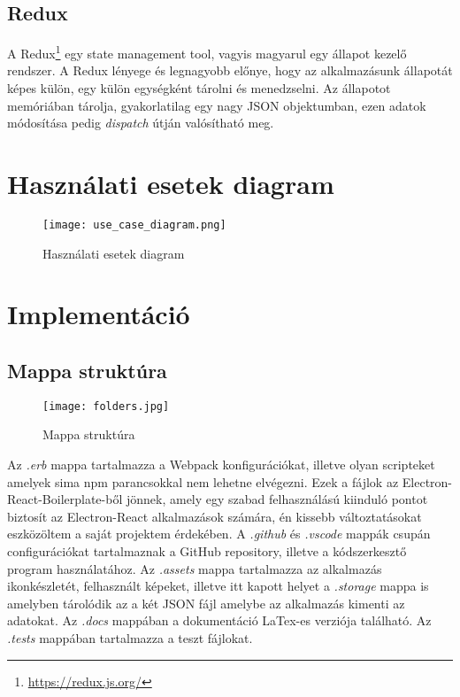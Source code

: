 \subsection{Redux}
A Redux\footnote{\url{https://redux.js.org/}} egy state management tool, vagyis magyarul egy állapot kezelő rendszer. A Redux lényege és legnagyobb előnye, hogy az alkalmazásunk állapotát képes külön, egy külön egységként tárolni és menedzselni. Az állapotot memóriában tárolja, gyakorlatilag egy nagy JSON objektumban, ezen adatok módosítása pedig {\it dispatch} útján valósítható meg.

\cleardoublepage
\section{Használati esetek diagram}
\begin{figure}[H]
	\centering
	\texttt{[image: use\_case\_diagram.png]}
	\caption{Használati esetek diagram}
	\label{fig:use_case_diagram}
\end{figure}

\section{Implementáció}

\subsection{Mappa struktúra}
\begin{figure}[H]
	\centering
	\texttt{[image: folders.jpg]}
	\caption{Mappa struktúra}
	\label{fig:folders}
\end{figure}
Az {\it .erb} mappa tartalmazza a Webpack konfigurációkat, illetve olyan scripteket amelyek sima npm parancsokkal nem lehetne elvégezni. Ezek a fájlok az Electron-React-Boilerplate-ből jönnek, amely egy szabad felhasználású kiinduló pontot biztosít az Electron-React alkalmazások számára, én kissebb változtatásokat eszközöltem a saját projektem érdekében.
A {\it .github} és {\it .vscode} mappák csupán configurációkat tartalmaznak a GitHub repository, illetve a kódszerkesztő program használatához.
Az {\it .assets} mappa tartalmazza az alkalmazás ikonkészletét, felhasznált képeket, illetve itt kapott helyet a {\it .storage} mappa is amelyben tárolódik az a két JSON fájl amelybe az alkalmazás kimenti az adatokat.
Az {\it .docs} mappában a dokumentáció LaTex-es verziója található.
Az {\it .tests} mappában tartalmazza a teszt fájlokat.

